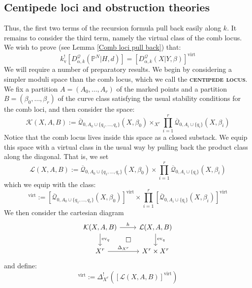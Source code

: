 \documentclass[11pt]{amsart}
\newcommand{\Q}[4]{\overline{\mathcal Q}_{#1,#2}(#3,#4)}
\newcommand{\PP}{\mathbb P}
\newcommand{\virt}[1]{[#1]^{\operatorname{virt}}}
\newcommand{\ev}{\operatorname{ev}}
\newcommand{\ildef}[1]{\textbf{\textsc{#1}}}
\theoremstyle{plain}
\theoremstyle{definition}
\begin{document}
\subsection{Centipede loci and obstruction theories}
Thus, the first two terms of the recursion formula pull back easily along $k$. It remains to consider the third term, namely the virtual class of the comb locus. We wish to prove (see Lemma \ref{Comb loci pull back}) that:
\begin{equation*} k_{\text{v}}^! [D^\mathcal{Q}_{\alpha,k}(\PP^N|H,d)] = \virt{D^\mathcal{Q}_{\alpha,k}(X|Y,\beta)} \end{equation*}
We will require a number of preparatory results. We begin by considering a simpler moduli space than the comb locus, which we call the \ildef{centipede locus}. We fix a partition $A=(A_0,\ldots,A_r)$ of the marked points and a partition $B=(\beta_0, \ldots, \beta_r)$ of the curve class satisfying the usual stability conditions for the comb loci, and then consider the space:
\begin{equation*} \mathcal{K}(X,A,B) := \Q{0}{A_0 \cup \{ q_1, \ldots, q_r \}}{X}{\beta_0} \times_{X^r} \prod_{i=1}^r \Q{0}{A_i\cup\{q_i\}}{X}{\beta_i} \end{equation*}
Notice that the comb locus lives inside this space as a closed substack. We equip this space with a virtual class in the usual way by pulling back the product class along the diagonal. That is, we set
\begin{equation*} \mathcal{L}(X,A,B) :=  \Q{0}{A_0 \cup \{ q_1, \ldots, q_r \}}{X}{\beta_0} \times \prod_{i=1}^r \Q{0}{A_i\cup\{q_i\}}{X}{\beta_i} \end{equation*}
which we equip with the class:
\begin{equation*} \virt{\mathcal{L}(X,A,B)} := \virt{\Q{0}{A_0 \cup \{ q_1, \ldots, q_r \}}{X}{\beta_0}} \times \prod_{i=1}^r \virt{\Q{0}{A_i\cup\{q_i\}}{X}{\beta_i}} \end{equation*}
We then consider the cartesian diagram
\begin{equation} \label{Product diagram}
\begin{tikzcd}
\mathcal{K}(X,A,B) \ar[r,"h"] \ar[d,"\ev_q"] \ar[rd,phantom,"\square"] & \mathcal{L}(X,A,B) \ar[d,"\ev_q"] \\
X^r \ar[r,"\Delta_{X^r}"] & X^r \times X^r
\end{tikzcd}
\end{equation}
and define:
\begin{equation*} \virt{\mathcal{K}(X,A,B)} := \Delta_{X^r}^! (\virt{\mathcal{L}(X,A,B)}) \end{equation*}
\end{document}
